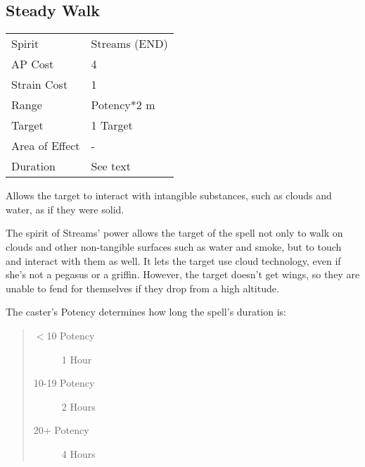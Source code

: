 \documentclass[11pt,a4paper,twocolumn]{book}
\begin{document}
\subsection*{Steady Walk}
{
	\begin{tabu} to 75mm{| X[l,4] | X[l,7] |}
		\hline
		Spirit 			& Streams (END) 	\\
		AP Cost	      	& 4 					\\
		Strain Cost     & 1 					\\
		Range     		& Potency*2 m			\\
		Target      	& 1 Target				\\
		Area of Effect  & - 	 				\\
		Duration     	& See text	            \\ \hline
	\end{tabu}
	
}

\medskip

Allows the target to interact with intangible substances, such as clouds and water, as if they were solid.

The spirit of Streams' power allows the target of the spell not only to walk on clouds and other non-tangible surfaces such as water and smoke, but to touch and interact with them as well. It lets the target use cloud technology, even if she's not a pegasus or a griffin. However, the target doesn't get wings, so they are unable to fend for themselves if they drop from a high altitude.

The caster's Potency determines how long the spell's duration is:

\begin{quote}
	\begin{description}
		\item[$<$10 Potency] 	1 Hour
		\item[10-19 Potency] 	2 Hours
		\item[20+ Potency] 		4 Hours
	\end{description}	
\end{quote}
\end{document}
